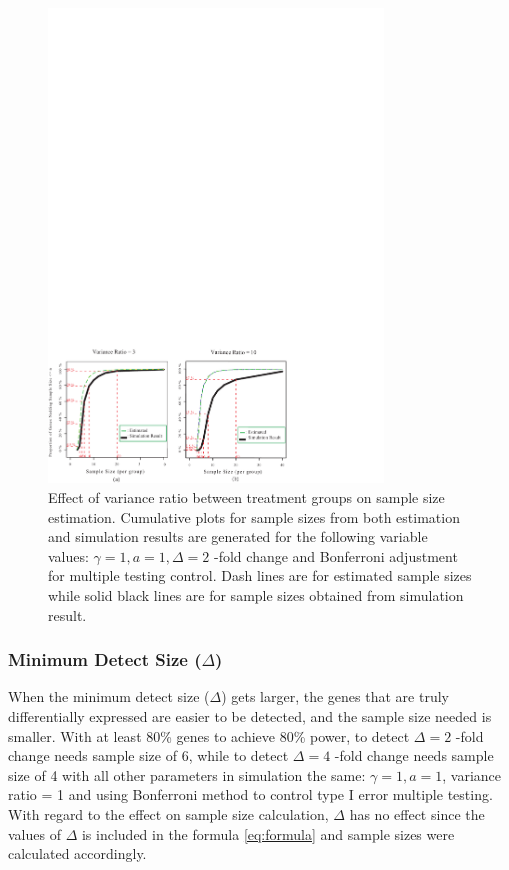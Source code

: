 \documentclass{bioinfo}
\begin{document}
\begin{figure}[h]
    \centerline{\includegraphics*[width=3.5in]{ResVarF.pdf}}
    \caption[Effect of variance ratio between treatment groups on sample size estimation]
    {Effect of variance ratio between treatment groups on sample size estimation.
    Cumulative plots for sample sizes from both estimation and simulation
    results are generated for the following variable values: $\gamma = 1, a = 1, \Delta = 2$ -fold change
    and Bonferroni adjustment for multiple testing control. Dash lines are for estimated sample sizes
    while solid black lines are for sample sizes obtained from simulation result.}
     \label{fig:ResVar}
\end{figure}

\subsubsection{Minimum Detect Size ($\Delta$)}

When the minimum detect size ($\Delta$) gets larger, the genes that are truly differentially expressed are easier to be
detected, and the sample size needed is smaller.  With at least 80\% genes to achieve 80\% power, to detect $\Delta = 2$ -fold
change needs sample size of 6, while to detect $\Delta = 4$ -fold change needs sample size of 4 with all other parameters in
simulation the same: $\gamma = 1, a = 1$, variance ratio = 1 and using Bonferroni method to control type I error multiple
testing. With regard to the effect on sample size calculation, $\Delta$ has no effect since the values of $\Delta$ is included
in the formula \ref{eq:formula} and sample sizes were calculated accordingly.
\end{document}
